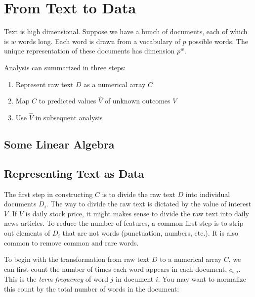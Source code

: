 \chapter{From Text to Data}


Text is high dimensional. 
Suppose we have a bunch of documents, each of 
which is $w$ words long. Each word is 
drawn from a vocabulary of $p$ possible 
words. The unique representation of these 
documents has dimension $p^w$. 

Analysis can 
summarized in three steps:

\begin{enumerate}
    \item Represent raw text $D$ as a numerical 
    array $C$
    \item Map $C$ to predicted 
    values $\hat{V}$ of unknown outcomes 
    $V$
    \item Use $\hat{V}$ in subsequent analysis
\end{enumerate}

\section{Some Linear Algebra}

\section{Representing Text as Data}
 

The first step in constructing $C$ is 
to divide the raw text $D$ into individual documents 
$D_i$. The way to divide the raw text 
is dictated by the value of interest $V$. 
If $V$ is daily stock price, it might makes sense
to divide the raw text into daily news articles.
To reduce the number of features, 
a common first step is to strip out elements 
of $D_i$ that are not words (punctuation,
numbers, etc.). 
It is also common to remove common and rare words.


To begin with the transformation from raw text $D$ to
a numerical array $C$, we can first count 
the number of times each word appears in each document, $c_{i,j}$.
This is the \textit{term frequency} of word $j$ in document $i$. You 
may want to normalize this count by the total number of words in the document:


